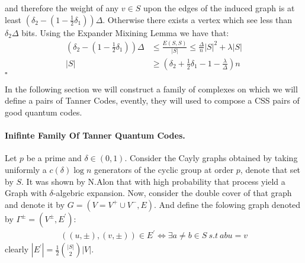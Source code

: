 \begin{multicols*}{2}
  and therefore the weight of any $v \in S$ upon the edges of the induced graph is at least $\left(\delta_{2} - \left( 1 - \frac{1}{2}\delta_{1} \right)\right)\Delta$. Otherwise there exists a vertex which see less than $\delta_{2}\Delta$ bits. Using the Expander Mixining Lemma we have that: 
  \begin{equation*}
    \begin{split}
      \left( \delta_{2} - \left( 1- \frac{1}{2}\delta_{ 1}  \right) \right)\Delta & \le \frac{E\left( S,S \right)}{|S|} \le \frac{\Delta}{n}|S|^2+ \lambda|S| \\
      |S| & \ge \left( \delta_{2} + \frac{1}{2}\delta_{1} -  1 - \frac{\lambda}{\Delta} \right)n 
    \end{split}
  \end{equation*}
   $\square$

  In the following section we will construct a family of complexes on which we will define a pairs of Tanner Codes, evently, they will used to compose a CSS pairs of good quantum codes.  
  \paragraph{Inifinte Family Of Tanner Quantum Codes.} 
  Let $p$ be a prime and $\delta \in \left( 0,1 \right)$. Consider the Cayly graphs obtained by taking uniformly a $c\left( \delta \right)\log n$ generators of the cyclic group at order $p$, denote that set by $S$. It was shown by N.Alon that with high probability that process yield a Graph with $\delta$-algebric expansion. Now, consider the double cover of that graph and denote it by $G = \left( V = V^{+} \cup V^{-},E \right)$. And define the folowing graph denoted by $\Gamma^{\pm} = \left(V^{\pm}, E^{\prime}\right)$:
  \begin{equation*}
    \begin{split}
      \left( \left(u , \pm  \right), \left( v, \pm \right) \right) \in  E^{\prime} \Leftrightarrow \exists a\neq b \in S \ s.t \ abu = v     
    \end{split}
  \end{equation*}
  clearly $|E^{\prime}| =  \frac{1}{2} {|S| \choose 2} |V|$.     
\end{multicols*}

